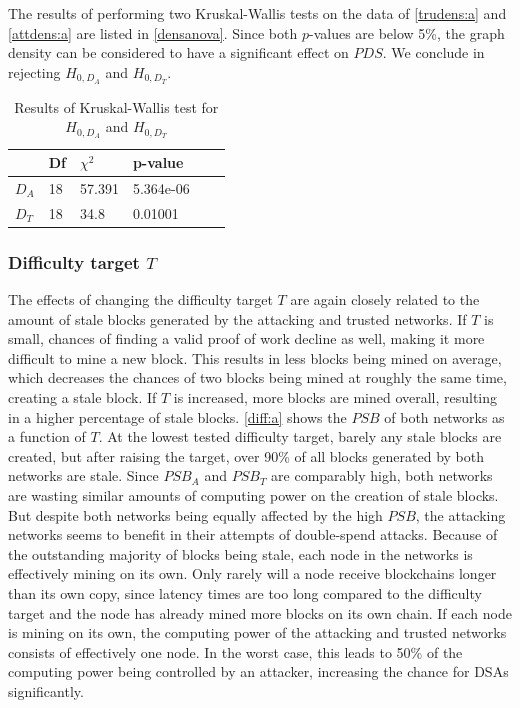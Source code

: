 \documentclass[a4paper,12pt,twoside]{report}
\begin{document}
The results of performing two Kruskal-Wallis tests on the data of \autoref{trudens:a} and \autoref{attdens:a} are listed in \autoref{densanova}. Since both $p$-values are below 5\%, the graph density can be considered to have a significant effect on $PDS$. We conclude in rejecting $H_{0,D_A}$ and $H_{0,D_T}$.
\begin{table}[hb]
\centering
\begin{tabular}{|l|l|l|l|l|l|} \hline
& Df & $\chi^{2}$ & p-value \\ \hline
$D_A$ & 18 &  57.391 & 5.364e-06 \\ \hline
$D_T$ & 18 & 34.8 & 0.01001 \\ \hline
\end{tabular}
\caption{Results of Kruskal-Wallis test for $H_{0,D_A}$ and $H_{0,D_T}$}
\label{densanova}
\end{table}

\subsubsection{Difficulty target $T$} \label{diffanalysis}
The effects of changing the difficulty target $T$ are again closely related to the amount of stale blocks generated by the attacking and trusted networks. If $T$ is small, chances of finding a valid proof of work decline as well, making it more difficult to mine a new block. This results in less blocks being mined on average, which decreases the chances of two blocks being mined at roughly the same time, creating a stale block. If $T$ is increased, more blocks are mined overall, resulting in a higher percentage of stale blocks. \autoref{diff:a} shows the $PSB$ of both networks as a function of $T$. At the lowest tested difficulty target, barely any stale blocks are created, but after raising the target, over 90\% of all blocks generated by both networks are stale. Since $PSB_A$ and $PSB_T$ are comparably high, both networks are wasting similar amounts of computing power on the creation of stale blocks. But despite both networks being equally affected by the high $PSB$, the attacking networks seems to benefit in their attempts of double-spend attacks. Because of the outstanding majority of blocks being stale, each node in the networks is effectively mining on its own. Only rarely will a node receive blockchains longer than its own copy, since latency times are too long compared to the difficulty target and the node has already mined more blocks on its own chain. If each node is mining on its own, the computing power of the attacking and trusted networks consists of effectively one node. In the worst case, this leads to 50\% of the computing power being controlled by an attacker, increasing the chance for DSAs significantly.
\end{document}
